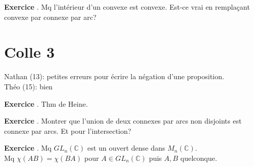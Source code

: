 \documentclass[10pt,a4paper]{article}
\newcounter{question}
\newcounter{exo}
\newenvironment{exo}{\vspace{0.5cm}\setcounter{question}{0}\addtocounter{exo}{1} \noindent \textbf{Exercice \theexo}. \normalsize }{\par}
\begin{document}
	\begin{exo}
		Mq l'intérieur d'un convexe est convexe. Est-ce vrai en remplaçant convexe par connexe par arc?
	\end{exo}
	
	\section*{Colle 3}
	\setcounter{exo}{0}
	Nathan (13): petites erreurs pour écrire la négation d'une proposition.\\
	Théo (15): bien\\
	
	\begin{exo}
		Thm de Heine.
	\end{exo}
	
	\begin{exo}
		Montrer que l'union de deux connexes par arcs non disjoints est connexe par arcs. Et pour l'intersection?
	\end{exo}

	\begin{exo}
		Mq $GL_n(\mathbb{C})$ est un ouvert dense dans $M_n(\mathbb{C})$.\\
		
		Mq $\chi(AB) = \chi(BA)$ pour $A\in GL_n(\mathbb{C})$ puis $A, B$ quelconque. 
	\end{exo}
		 
\end{document}
